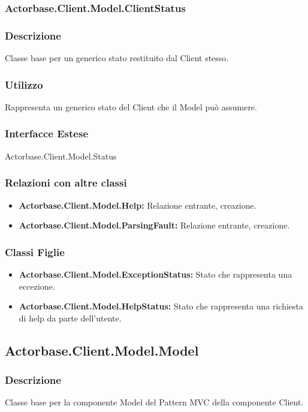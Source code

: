 \documentclass[a4paper]{article}
\begin{document}
			
		\subsubsection{Actorbase.Client.Model.ClientStatus}
			\subsubsection{Descrizione}
				Classe base per un generico stato restituito dal Client stesso.
			\subsubsection{Utilizzo}
				Rappresenta un generico stato del Client che il Model può assumere.
			\subsubsection{Interfacce Estese}
				Actorbase.Client.Model.Status
			\subsubsection{Relazioni con altre classi}
				\begin{itemize}
					\item \textbf{Actorbase.Client.Model.Help:} Relazione entrante, creazione.
					\item \textbf{Actorbase.Client.Model.ParsingFault:} Relazione entrante, creazione.
				\end{itemize}
			\subsubsection{Classi Figlie}
				\begin{itemize}
					\item \textbf{Actorbase.Client.Model.ExceptionStatus:}
						Stato che rappresenta una eccezione.
					\item \textbf{Actorbase.Client.Model.HelpStatus:}
						Stato che rappresenta una richiesta di help da parte dell'utente.
				\end{itemize}
			
		\subsection{Actorbase.Client.Model.Model}
			\subsubsection{Descrizione}
				Classe base per la componente Model del Pattern MVC della componente Client.
\end{document}
